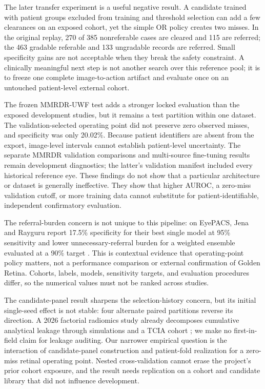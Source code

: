 \documentclass[11pt]{article}
\begin{document}
The later transfer experiment is a useful negative result. A candidate trained with patient groups excluded from training and threshold selection can add a few clearances on an exposed cohort, yet the simple OR policy creates two misses. In the original replay, 270 of 385 nonreferable cases are cleared and 115 are referred; the 463 gradable referable and 133 ungradable records are referred. Small specificity gains are not acceptable when they break the safety constraint. A clinically meaningful next step is not another search over this reference pool; it is to freeze one complete image-to-action artifact and evaluate once on an untouched patient-level external cohort.

The frozen MMRDR-UWF test adds a stronger locked evaluation than the exposed development studies, but it remains a test partition within one dataset. The validation-selected operating point did not preserve zero observed misses, and specificity was only 20.02\%. Because patient identifiers are absent from the export, image-level intervals cannot establish patient-level uncertainty. The separate MMRDR validation comparisons and multi-source fine-tuning results remain development diagnostics; the latter's validation manifest included every historical reference eye. These findings do not show that a particular architecture or dataset is generally ineffective. They show that higher AUROC, a zero-miss validation cutoff, or more training data cannot substitute for patient-identifiable, independent confirmatory evaluation.

The referral-burden concern is not unique to this pipeline: on EyePACS, Jena and Rayguru report 17.5\% specificity for their best single model at 95\% sensitivity and lower unnecessary-referral burden for a weighted ensemble evaluated at a 90\% target \cite{jena2026}. This is contextual evidence that operating-point policy matters, not a performance comparison or external confirmation of Golden Retina. Cohorts, labels, models, sensitivity targets, and evaluation procedures differ, so the numerical values must not be ranked across studies.

The candidate-panel result sharpens the selection-history concern, but its initial single-seed effect is not stable: four alternate paired partitions reverse its direction. A 2026 factorial radiomics study already decomposes cumulative analytical leakage through simulations and a TCIA cohort \cite{garciahidalgo2026}; we make no first-in-field claim for leakage auditing. Our narrower empirical question is the interaction of candidate-panel construction and patient-fold realization for a zero-miss retinal operating point. Nested cross-validation cannot erase the project's prior cohort exposure, and the result needs replication on a cohort and candidate library that did not influence development.
\end{document}
